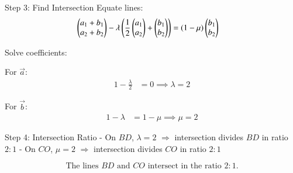 \documentclass{beamer}
\begin{document}
\begin{frame}{Step 3: Find Intersection}
Equate lines:
\begin{align}
\begin{pmatrix}a_1 + b_1\\a_2 + b_2\end{pmatrix} - \lambda \left(\frac{1}{2} \begin{pmatrix}a_1\\a_2\end{pmatrix} + \begin{pmatrix}b_1\\b_2\end{pmatrix}\right) &= (1 - \mu) \begin{pmatrix}b_1\\b_2\end{pmatrix}
\end{align}

Solve coefficients:

For $\vec{a}$:
\begin{align}
1 - \frac{\lambda}{2} &= 0 \implies \lambda = 2
\end{align}

For $\vec{b}$:
\begin{align}
1 - \lambda &= 1 - \mu \implies \mu = 2
\end{align}
\end{frame}

\begin{frame}{Step 4: Intersection Ratio}
- On $BD$, $\lambda = 2$ $\Rightarrow$ intersection divides $BD$ in ratio $2:1$  
- On $CO$, $\mu = 2$ $\Rightarrow$ intersection divides $CO$ in ratio $2:1$

\[
\boxed{\text{The lines $BD$ and $CO$ intersect in the ratio } 2:1.}
\]
\end{frame}
\end{document}
